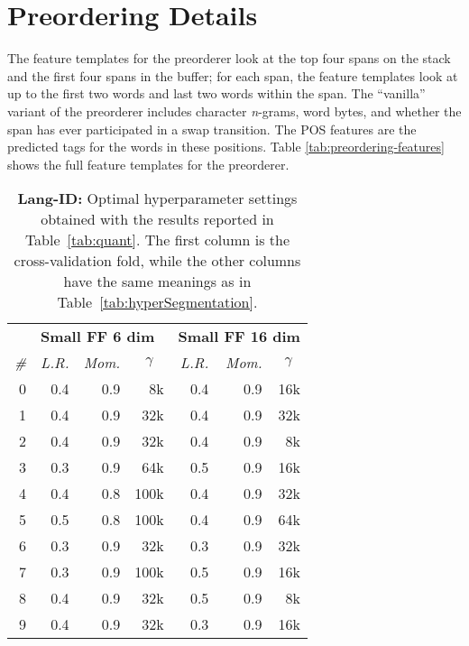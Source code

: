 \documentclass[11pt,letterpaper]{article}
\newcommand{\maincaptionref}{\ref{tab:hyperSegmentation}}
\begin{document}
\section{Preordering Details}
The feature templates for the preorderer look at the top four spans on the stack and the first four spans in the buffer;
for each span, the feature templates look at up to the first two words and last two words  within the span.
The ``vanilla'' variant of the preorderer includes character {\it n}-grams, word bytes, and whether the span has ever participated in a {\sc swap} transition.
The POS features are the predicted tags for the words in these positions.  Table \ref{tab:preordering-features} shows the full feature templates for the preorderer.

\begin{table}[htbp]
\begin{tabular}{r|rrr|rrr}
  & \multicolumn{3}{|l}{\bf Small FF 6 dim} & \multicolumn{3}{|l}{\bf Small FF 16 dim}  \\
  {\it \#} & {\it L.R.} & {\it Mom.} & \multicolumn{1}{c|}{$\gamma$} & 
               {\it L.R.} & {\it Mom.} & \multicolumn{1}{c}{$\gamma$}  \\ \hline
  0 & 0.4 & 0.9 & 8k & 0.4 & 0.9 & 16k \\
  1 & 0.4 & 0.9 & 32k & 0.4 & 0.9 & 32k \\
  2 & 0.4 & 0.9 & 32k & 0.4 & 0.9 & 8k \\
  3 & 0.3 & 0.9 & 64k & 0.5 & 0.9 & 16k \\
  4 & 0.4 & 0.8 & 100k & 0.4 & 0.9 & 32k \\
  5 & 0.5 & 0.8 & 100k & 0.4 & 0.9 & 64k \\
  6 & 0.3 & 0.9 & 32k & 0.3 & 0.9 & 32k \\
  7 & 0.3 & 0.9 & 100k & 0.5 & 0.9 & 16k \\
  8 & 0.4 & 0.9 & 32k & 0.5 & 0.9 & 8k \\
  9 & 0.4 & 0.9 & 32k & 0.3 & 0.9 & 16k \\
\end{tabular}
  \caption{{\bf Lang-ID:} Optimal hyperparameter settings obtained with the results reported in Table~\ref{tab:quant}. The first column is the cross-validation fold, while the other
  columns have the same meanings as in Table~\maincaptionref.
  }
  \label{tab:hyper-langid}
\end{table}
\end{document}
